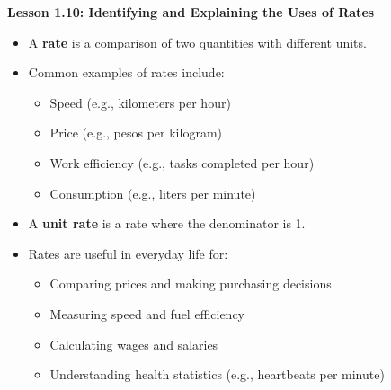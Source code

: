 \begin{center}
\textbf{Lesson 1.10: Identifying and Explaining the Uses of Rates}
\end{center}

\vspace*{-1.5ex}

\begin{itemize}
    \item A \textbf{rate} is a comparison of two quantities with different units.
    \item Common examples of rates include:
    \begin{itemize}
        \item Speed (e.g., kilometers per hour)
        \item Price (e.g., pesos per kilogram)
        \item Work efficiency (e.g., tasks completed per hour)
        \item Consumption (e.g., liters per minute)
    \end{itemize}
    \item A \textbf{unit rate} is a rate where the denominator is 1.
    \item Rates are useful in everyday life for:
    \begin{itemize}
        \item Comparing prices and making purchasing decisions
        \item Measuring speed and fuel efficiency
        \item Calculating wages and salaries
        \item Understanding health statistics (e.g., heartbeats per minute)
    \end{itemize}
\end{itemize}
